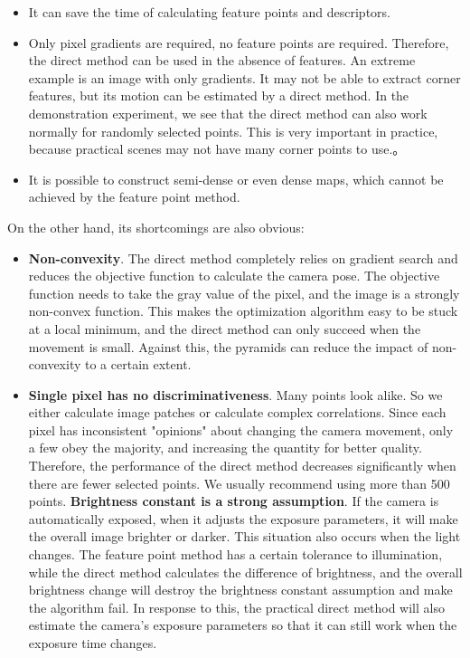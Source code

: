 \begin{itemize}
	\item It can save the time of calculating feature points and descriptors.
	\item Only pixel gradients are required, no feature points are required. Therefore, the direct method can be used in the absence of features. An extreme example is an image with only gradients. It may not be able to extract corner features, but its motion can be estimated by a direct method. In the demonstration experiment, we see that the direct method can also work normally for randomly selected points. This is very important in practice, because practical scenes may not have many corner points to use.。
	\item It is possible to construct semi-dense or even dense maps, which cannot be achieved by the feature point method.
\end{itemize}

On the other hand, its shortcomings are also obvious:
\begin{itemize}
	\item \textbf{Non-convexity}. The direct method completely relies on gradient search and reduces the objective function to calculate the camera pose. The objective function needs to take the gray value of the pixel, and the image is a strongly non-convex function. This makes the optimization algorithm easy to be stuck at a local minimum, and the direct method can only succeed when the movement is small. Against this, the pyramids can reduce the impact of non-convexity to a certain extent.
	\item \textbf{Single pixel has no discriminativeness}. Many points look alike. So we either calculate image patches or calculate complex correlations. Since each pixel has inconsistent "opinions" about changing the camera movement, only a few obey the majority, and increasing the quantity for better quality. Therefore, the performance of the direct method decreases significantly when there are fewer selected points. We usually recommend using more than 500 points.
	\textbf{Brightness constant is a strong assumption}. If the camera is automatically exposed, when it adjusts the exposure parameters, it will make the overall image brighter or darker. This situation also occurs when the light changes. The feature point method has a certain tolerance to illumination, while the direct method calculates the difference of brightness, and the overall brightness change will destroy the brightness constant assumption and make the algorithm fail. In response to this, the practical direct method will also estimate the camera's exposure parameters \cite{Engel2016} so that it can still work when the exposure time changes.
\end{itemize}

